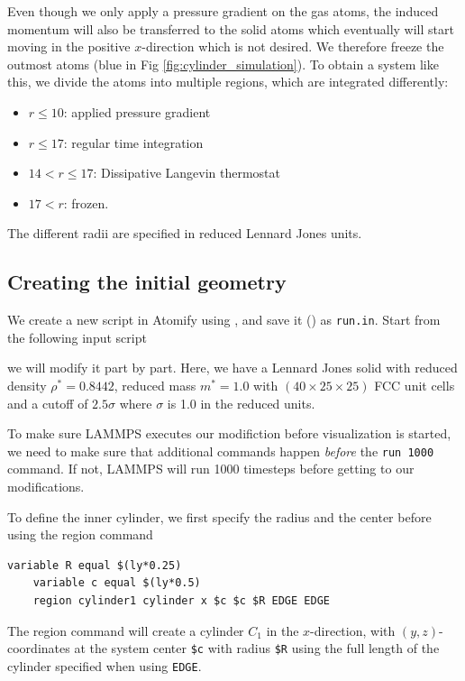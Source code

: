 \documentclass[aps,pre,twocolumn,letterpaper,floatfix,nofootinbib]{revtex4}
\newcommand{\code}[1]{\colorbox{light-gray}{\color{RawSienna}\texttt{#1}}}
\begin{document}
Even though we only apply a pressure gradient on the gas atoms, the induced momentum will also be transferred to the solid atoms which eventually will start moving in the positive $x$-direction which is not desired.
We therefore freeze the outmost atoms (blue in Fig \ref{fig:cylinder_simulation}).
To obtain a system like this, we divide the atoms into multiple regions, which are integrated differently:

\begin{itemize}
	\item $r \leq 10$: applied pressure gradient
	\item $r \leq 17$: regular time integration
	\item $14 < r \leq 17$: Dissipative Langevin thermostat
	\item $17 < r$: frozen.
\end{itemize}
The different radii are specified in reduced Lennard Jones units.

\subsection{Creating the initial geometry}
We create a new script in Atomify using , and save it () as \code{run.in}.
Start from the following input script

we will modify it part by part.
Here, we have a Lennard Jones solid with reduced density
$\rho^* = 0.8442$, reduced mass $m^* = 1.0$ with $(40\times25\times25)$
FCC unit cells and a cutoff of $2.5\sigma$ where $\sigma$ is 1.0 in the reduced units.


To make sure LAMMPS executes our modifiction before visualization is started,
we need to make sure that additional commands happen \textit{before} the \code{run 1000} command.
If not, LAMMPS will run 1000 timesteps before getting to our modifications.

To define the inner cylinder, we first specify the radius and the center before using the region command
\begin{lstlisting}[basicstyle=\tiny, frame = none, numbers=none, framexleftmargin=0pt, xleftmargin=-0.75cm, xrightmargin=0.0cm]
	variable R equal $(ly*0.25)
	variable c equal $(ly*0.5)
	region cylinder1 cylinder x $c $c $R EDGE EDGE
\end{lstlisting}
The region command will create a cylinder $C_1$ in the $x$-direction, with $(y,z)$-coordinates at the system center \code{\$c} with radius \code{\$R} using the full length of the cylinder specified when using \code{EDGE}.
\end{document}
